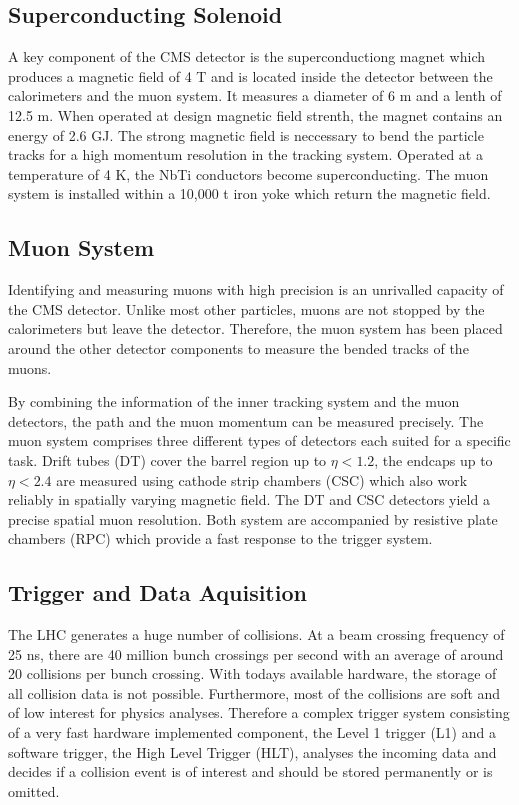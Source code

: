 \subsection{Superconducting Solenoid}

A key component of the CMS detector is the superconductiong magnet which
produces a magnetic field of 4 T and is located inside the detector between the
calorimeters and the muon system. It measures a diameter of 6 m and a lenth of
12.5 m. When operated at design magnetic field strenth, the magnet contains an
energy of 2.6 GJ. The strong magnetic field is neccessary to bend the particle
tracks for a high momentum resolution in the tracking system. Operated at a
temperature of 4 K, the NbTi conductors become superconducting. The muon system
is installed within a 10,000 t iron yoke which return the magnetic field.

\subsection{Muon System}

Identifying and measuring muons with high precision is an unrivalled capacity of
the CMS detector. Unlike most other particles, muons are not stopped by the
calorimeters but leave the detector. Therefore, the muon system has been placed
around the other detector components to measure the bended tracks of the muons.

By combining the information of the inner tracking system and the muon
detectors, the path and the muon momentum can be measured precisely. The muon
system comprises three different types of detectors each suited for a specific
task. Drift tubes (DT) cover the barrel region up to $\eta < 1.2$, the endcaps
up to $\eta < 2.4$ are measured using cathode strip chambers (CSC) which also
work reliably in spatially varying magnetic field. The DT and CSC detectors
yield a precise spatial muon resolution. Both system are accompanied by
resistive plate chambers (RPC) which provide a fast response to the trigger
system.

\subsection{Trigger and Data Aquisition}

The LHC generates a huge number of collisions. At a beam crossing frequency of
25 ns, there are 40 million bunch crossings per second with an average of around
20 collisions per bunch crossing. With todays available hardware, the storage of
all collision data is not possible. Furthermore, most of the collisions are soft
and of low interest for physics analyses. Therefore a complex trigger system
consisting of a very fast hardware implemented component, the Level 1 trigger
(L1) and a software trigger, the High Level Trigger (HLT), analyses the incoming
data and decides if a collision event is of interest and should be stored
permanently or is omitted.

